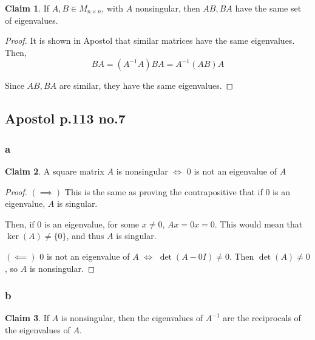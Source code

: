 \documentclass[12pt,letterpaper]{article}
\theoremstyle{definition}
\newtheorem*{claim}{Claim}
\begin{document}
\begin{claim}
  If $A, B \in M_{n \times n}$, with $A$ nonsingular, then $AB, BA$ have the
  same set of eigenvalues.
\end{claim}

\begin{proof}
  It is shown in Apostol that similar matrices have the same eigenvalues. Then,
  \[
    BA = (A^{-1}A)BA =A^{-1}(AB)A 
  \]

  Since $AB, BA$ are similar, they have the same eigenvalues.
\end{proof}

\subsection*{Apostol p.113 no.7}

\subsubsection*{a}

\begin{claim}
  A square matrix $A$ is nonsingular $\iff$ 0 is not an eigenvalue of $A$
\end{claim}

\begin{proof}
  $(\implies)$ This is the same as proving the contrapositive that if 0 is an eigenvalue, $A$ is
  singular.

  Then, if 0 is an eigenvalue, for some $x \neq 0 $,  $Ax = 0x = 0$. This would
  mean that $\ker(A) \neq \{0\}$, and thus $A$ is singular.

  $(\impliedby)$ 0 is not an eigenvalue of $A$ $\iff$ $\det(A - 0I) \neq 0$.
  Then $\det(A) \neq 0$, so $A$ is nonsingular.
\end{proof}

\subsubsection*{b}

\begin{claim}
  If $A$ is nonsingular, then the eigenvalues of $A^{-1}$ are the reciprocals of
  the eigenvalues of $A$.
\end{claim}
\end{document}
